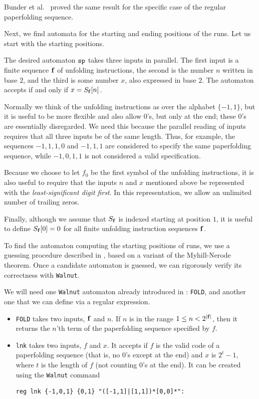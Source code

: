 \documentclass[12pt,reqno]{article}
\begin{document}
\begin{remark}
Bunder et al.~\cite{Bunder&Bates&Arnold:2024} proved the same result
for the specific case of the regular paperfolding sequence.
\end{remark}

Next, we find automata for the starting and ending positions of
the runs.  Let us start with the starting positions.

The desired automaton $\tt sp$ takes three inputs in parallel.
The first input is a finite
sequence $\bf f$ of unfolding instructions, the second is the number $n$ written
in base $2$, and the third is some number $x$, also expressed in base $2$.
The automaton accepts if and only if $x = S_{\bf f} [n]$.

Normally we think of the unfolding
instructions as over the alphabet $\{ -1, 1 \}$, but it is useful to
be more flexible and also allow $0$'s, but only at the end;
these $0$'s are essentially disregarded.  
We need this because the parallel reading of inputs requires
that all three inputs be of the same length.  
Thus, for example, the sequences $-1, 1, 1, 0$ and $-1, 1, 1$ are
considered to specify the same paperfolding sequence, while
$-1, 0, 1, 1$ is not considered a valid specification.

Because we choose to let $f_0$ be the first symbol of the unfolding instructions, it is also useful to require that the inputs $n$ and $x$ mentioned above
be represented with the {\it least-significant digit first}.
In this representation, we allow an unlimited number of trailing zeros.

Finally, although we assume that $S_{\bf f}$ is indexed starting at position $1$,
it is useful to define $S_{\bf f}[0] = 0$ for all finite unfolding
instruction sequences $\bf f$.

To find the automaton computing the starting positions of runs, we use
a guessing procedure described in \cite{Shallit:2023}, based on a variant
of the Myhill-Nerode theorem.  Once a candidate automaton is guessed,
we can rigorously verify its correctness with {\tt Walnut}.

We will need one {\tt Walnut} automaton already introduced
in \cite{Shallit:2023}: {\tt FOLD}, and another one that we can define
via a regular expression.
\begin{itemize}
\item {\tt FOLD} takes two inputs, $\bf f$ and $n$.  If $n$ is
in the range $1 \leq n < 2^{|{\bf f}|}$, then it returns the 
$n$'th term of the paperfolding sequence specified by $f$.
\item {\tt lnk} takes two inputs, $f$ and $x$. It accepts if
$f$ is the valid code of a paperfolding sequence (that is, no
$0$'s except at the end) and $x$ is $2^t-1$, where $t$ is the
length of $f$ (not counting $0$'s at the end).
It can be created using the {\tt Walnut} command
\begin{verbatim}
reg lnk {-1,0,1} {0,1} "([-1,1]|[1,1])*[0,0]*":
\end{verbatim}

\end{itemize}
\end{document}
